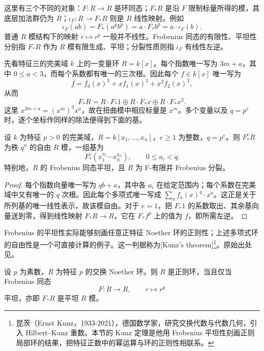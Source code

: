 这里有三个不同的对象：\(F:R\to R\) 是环同态；\(F_*R\) 是沿 \(F\) 限制标量所得的模，其底层加法群仍为 \(R\)；\(\iota_F:R\to F_*R\) 则是 \(R\) 线性映射。例如
\[
	\iota_F(ab)=F_*(a^pb^p)=a\cdot F_*b^p=a\cdot\iota_F(b).
\]
普通 \(R\) 模结构下的映射 \(r\mapsto r^p\) 一般并不线性。Frobenius 同态的有限性、平坦性分别指 \(F_*R\) 作为 \(R\) 模有限生成、平坦；分裂性质则指 \(\iota_F\) 有线性左逆。

\ProseParagraphBreak
先看特征三的完美域 \(k\) 上的一变量环 \(R=k[x]\)。每个指数唯一写为 \(3m+a\)，其中 \(0\le a<3\)，而每个系数都有唯一的三次根。因此每个 \(f\in k[x]\) 唯一写为
\[
	f=f_0(x)^3+x f_1(x)^3+x^2f_2(x)^3,
\]
从而
\[
	F_*R=R\cdot F_*1\oplus R\cdot F_*x\oplus R\cdot F_*x^2.
\]
这里 \(x^{3m+a}=(x^m)^3x^a\)，故在扭曲模中相应标量是 \(x^m\)。多个变量以及 \(q=p^e\) 时，逐个坐标作同样的除法便得到下面的基。

\begin{proposition}\label{b3:prop:polynomial-frobenius-free}
	设 \(k\) 为特征 \(p>0\) 的完美域，\(R=k[x_1,\ldots,x_n]\)，\(e\ge1\) 为整数，\(q=p^e\)。则 \(F_*^eR\) 为秩 \(q^n\) 的自由 \(R\) 模，一组基为
	\[
		F_*^e(x_1^{a_1}\cdots x_n^{a_n}),\qquad0\le a_i<q.
	\]
	特别地，\(R\) 的 Frobenius 同态平坦，且 \(R\) 为 F-有限并 Frobenius 分裂。
\end{proposition}
\begin{proof}
	每个指数向量唯一写为 \(qb+a\)，其中各 \(a_i\) 在给定范围内；每个系数在完美域中又有唯一的 \(q\) 次根。因此每个多项式唯一写成 \(\sum_a f_a(x)^q\cdot x^a\)。这正是关于所列基的唯一线性表示，故该模自由。对于 \(e=1\)，把 \(F_*1\) 的系数取出、其余基向量送到零，得到线性映射 \(F_*R\to R\)，它在 \(F_*f^p\) 上的值为 \(f\)，即所需左逆。
\end{proof}

Frobenius 的平坦性实际能够刻画任意正特征 Noether 环的正则性；上述多项式环的自由性是一个可直接计算的例子。这一判据称为[Kunz's theorem]\footnote{昆茨（Ernst Kunz，1933-2021），德国数学家，研究交换代数与代数几何，引入 Hilbert--Kunz 重数。本节的 Kunz 定理是他用 Frobenius 平坦性刻画正则局部环的结果，把特征正数中的幂运算与环的正则性相联系。}。原始出处见\cite{Kunz1969RegularLocalRings}。

\begin{claim}[Kunz]\label{b3:claim:C-kunz}
	设 \(p\) 为素数，\(R\) 为特征 \(p\) 的交换 Noether 环。则 \(R\) 是正则环，当且仅当 Frobenius 同态
	\[
		F:R\longrightarrow R,\qquad r\longmapsto r^p
	\]
	平坦，亦即 \(F_*R\) 是平坦 \(R\) 模。
\end{claim}

